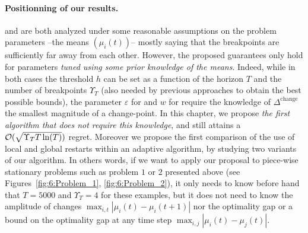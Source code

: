 \paragraph{Positionning of our results.}
%
\CUSUMUCB{} and \MUCB{} are both analyzed under some reasonable assumptions on the problem parameters --the means $(\mu_i(t))$-- mostly saying that the breakpoints are sufficiently far away from each other.
%
However, the proposed guarantees only hold for parameters \emph{tuned using some prior knowledge of the means}.
Indeed, while in both cases the threshold $h$ can be set as a function of the horizon $T$ and the number of breakpoints  $\Upsilon_T$ (also needed by previous approaches to obtain the best possible bounds), the parameter $\varepsilon$ for \CUSUM{} and $w$ for \MUCB{} require the knowledge of $\Delta^{\text{change}}$ the smallest magnitude of a change-point.
%
In this chapter, we propose \emph{the first algorithm that does not require this knowledge}, and still attains a $\mathcal{O}(\sqrt{\Upsilon_T T\ln(T)})$ regret.
Moreover we propose the first comparison of the use of local and global restarts within an adaptive algorithm, by studying two variants of our algorithm.
%
In others words, if we want to apply our proposal to piece-wise stationary problems such as problem $1$ or $2$ presented above (see Figures~\ref{fig:6:Problem_1}, \ref{fig:6:Problem_2}),
it only needs to know before hand that $T=5000$ and $\Upsilon_T=4$ for these examples, but it does not need to know the amplitude of changes $\max_{i,t} |\mu_i(t) - \mu_i(t+1)|$ nor the optimality gap or a bound on the optimality gap at any time step $\max_{i,j} |\mu_i(t) - \mu_j(t)|$.

